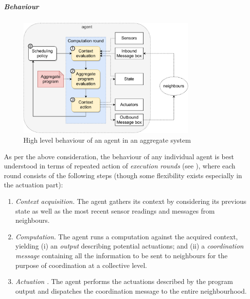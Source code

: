 \subparagraph{Behaviour}
\begin{figure}
    \centering
    \includegraphics[width=0.8\textwidth]{chapters/img/aggregate-agent-control-architecture.pdf}
    \caption{High level behaviour of an agent in an aggregate system}\label{fig:aggregate-agent-control-architecture}
\end{figure}
%
As per the above consideration,
 the behaviour of any individual agent is best understood
 in terms of repeated action of \emph{execution rounds} (see ), where each round consists of the following steps (though some flexibility exists especially in the actuation part):
%
\begin{enumerate}
\item \emph{Context acquisition.} The agent gathers its context by considering its previous state as well as the most recent sensor readings and messages from neighbours.
\item \emph{Computation.} The agent runs a computation against the acquired context, 
 yielding (i) an \emph{output} describing potential actuations; 
 and (ii) a \emph{coordination message} containing all the information to be sent to neighbours for the purpose of coordination at a collective level.
\item \emph{Actuation .} The agent performs the actuations described by the program output and dispatches the coordination message to the entire neighbourhood.
\end{enumerate}
%

